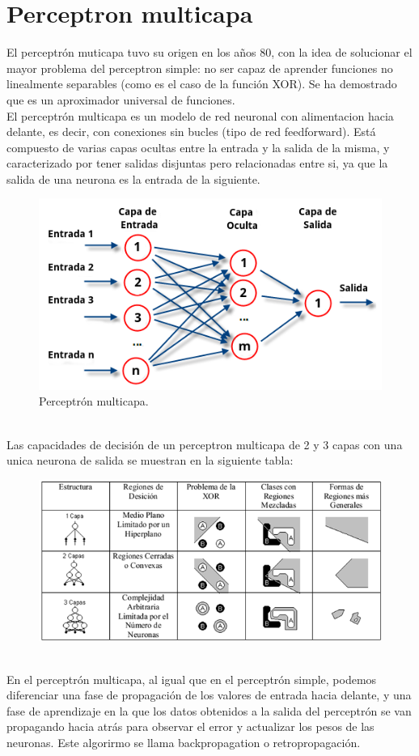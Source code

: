 \section {Perceptron multicapa}
El perceptrón muticapa tuvo su origen en los años 80, con la idea de solucionar el mayor problema del perceptron simple: no ser capaz de aprender funciones no linealmente separables (como es el caso de la función XOR). Se ha demostrado que es un aproximador universal de funciones.
\\El perceptrón multicapa es un modelo de red neuronal con alimentacion hacia delante, es decir, con conexiones sin bucles (tipo de red feedforward). Está compuesto de varias capas ocultas entre la entrada y la salida de la misma, y caracterizado por tener salidas disjuntas pero relacionadas entre si, ya que la salida de una neurona es la entrada de la siguiente.
\begin{figure}[htp]
\centering
\includegraphics[scale=1.2]{images/multilayerperceptron.png}
\caption{Perceptrón multicapa.}
\end{figure}
\\Las capacidades de decisión de un perceptron multicapa de 2 y 3 capas con una unica neurona de salida se muestran en la siguiente tabla:
\begin{figure}[htp]
\centering
\includegraphics[scale=0.7]{images/perceptron23capas.png}
\end{figure}
\\En el perceptrón multicapa, al igual que en el perceptrón simple, podemos diferenciar una fase de propagación de los valores de entrada hacia delante, y una fase de aprendizaje en la que los datos obtenidos a la salida del perceptrón se van propagando hacia atrás para observar el error y actualizar los pesos de las neuronas. Este algorirmo se llama backpropagation o retropropagación.

